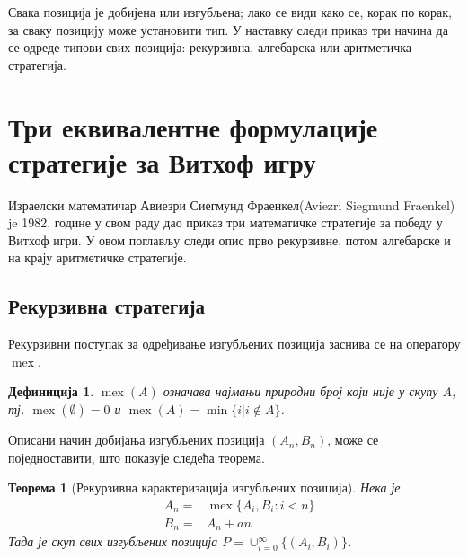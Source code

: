 \documentclass[a4paper]{article}
\newtheorem{theorem}{Теорема}
\newtheorem{definition}{Дефиниција}
\DeclareMathOperator{\mex}{mex}
\begin{document}
Свака позиција је добијена или изгубљена; лако се види како се, корак по корак, за сваку позицију може установити тип. У наставку следи приказ три начина да се одреде типови свих позиција: рекурзивна, алгебарска или аритметичка стратегија.

\section{Три еквивалентне формулације стратегије за Витхоф игру}
\label{sec:tri_Strategije}

Израелски математичар Авиезри Сиегмунд Фраенкел(Aviezri Siegmund Fraenkel) je 1982. године у свом раду \cite{10.2307/2321643} дао приказ три математичке стратегије за победу у Витхоф игри. У овом поглављу следи опис прво рекурзивне, потом алгебарске и на крају аритметичке стратегије.

\subsection{Рекурзивна стратегија}

Рекурзивни поступак за одређивање изгубљених позиција заснива се на оператору $ \mex $.

\begin{definition}
	\label{def:mex}
	$\mex(A)$ означава најмањи природни број који није у скупу $ A $, тј. $ \mex(\emptyset)=0 $ и
$ \mex(A)=\min\{i | i\notin A\} $.
\end{definition}

Описани начин добијања изгубљених позиција $ (A_{n}, B_{n}) $, може се поједноставити, што показује следећа теорема. 

\begin{theorem} [Рекурзивна карактеризација изгубљених позиција]
	\label{thm:reukrzivna_strategija}
	Нека је 
	\begin{eqnarray}
		&A_{n} = &\mex \{ A_{i}, B_{i} : i < n \}\\
		&B_{n} = &A_{n} + an
	\end{eqnarray}
	Тада је скуп свих изгубљених позиција
	$ P = \cup_{i=0}^{\infty} \{(A_{i},B_{i})\} $.
\end{theorem}
\end{document}
